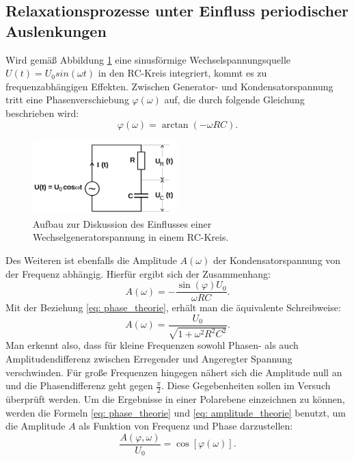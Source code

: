 \subsection{Relaxationsprozesse unter Einfluss periodischer Auslenkungen}
Wird gemäß Abbildung \ref{fig: aufbau_2} eine sinusförmige Wechselspannungsquelle $U(t) = U_0sin(\omega t)$ in den RC-Kreis integriert, kommt es zu frequenzabhängigen
Effekten. Zwischen Generator- und Kondensatorspannung tritt eine Phasenverschiebung $\varphi(\omega)$ auf, die durch folgende Gleichung
beschrieben wird:
\begin{equation}
  \varphi(\omega) = \arctan(-\omega RC).
  \label{eq: phase_theorie}
\end{equation}
\FloatBarrier
\begin{figure}
  \centering
\includegraphics[width = 0.5\textwidth]{pics/aufbau_2.png}
\caption{Aufbau zur Diskussion des Einflusses einer Wechselgeneratorspannung in einem RC-Kreis\cite{anleitung353}. }
\label{fig: aufbau_2}
\end{figure}
Des Weiteren ist ebenfalls die Amplitude $A(\omega)$ der Kondensatorspannung von der Frequenz abhängig. Hierfür ergibt sich der Zusammenhang:
\begin{equation}
  A(\omega) = -\frac{\sin(\varphi) U_0}{\omega RC}.
  \label{eq: amplitude_sin}
\end{equation}
Mit der Beziehung \eqref{eq: phase_theorie}, erhält man die äquivalente Schreibweise:
\begin{equation}
  A(\omega) = \frac{U_0}{\sqrt{1 +\omega^2R^2C^2}}.
  \label{eq: amplitude_theorie}
\end{equation}
Man erkennt also, dass für kleine Frequenzen sowohl Phasen- als auch Amplitudendifferenz zwischen Erregender und Angeregter Spannung verschwinden.
Für große Frequenzen hingegen nähert sich die Amplitude null an und die Phasendifferenz geht gegen $\frac{\pi}{2}$. Diese Gegebenheiten sollen
im Versuch überprüft werden. Um die Ergebnisse in einer Polarebene einzeichnen zu können, werden die Formeln \eqref{eq: phase_theorie} und %
\eqref{eq: amplitude_theorie} benutzt, um die Amplitude $A$ als Funktion von Frequenz und Phase darzustellen:
\begin{equation}
\frac{A(\varphi, \omega)}{U_0} = \cos\left[\varphi(\omega)\right].
  \label{eq: amplitude_phase}
\end{equation}

